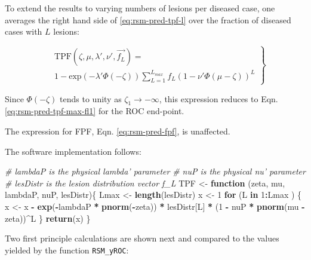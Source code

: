 \documentclass[
]{book}
\newenvironment{Shaded}{\begin{snugshade}}{\end{snugshade}}
\newcommand{\CommentTok}[1]{\textcolor[rgb]{0.56,0.35,0.01}{\textit{#1}}}
\newcommand{\ControlFlowTok}[1]{\textcolor[rgb]{0.13,0.29,0.53}{\textbf{#1}}}
\newcommand{\DecValTok}[1]{\textcolor[rgb]{0.00,0.00,0.81}{#1}}
\newcommand{\KeywordTok}[1]{\textcolor[rgb]{0.13,0.29,0.53}{\textbf{#1}}}
\newcommand{\NormalTok}[1]{#1}
\newcommand{\OperatorTok}[1]{\textcolor[rgb]{0.81,0.36,0.00}{\textbf{#1}}}
\newcommand{\StringTok}[1]{\textcolor[rgb]{0.31,0.60,0.02}{#1}}
\begin{document}
To extend the results to varying numbers of lesions per diseased case, one averages the right hand side of \eqref{eq:rsm-pred-tpf-l} over the fraction of diseased cases with \(L\) lesions:

\begin{equation}
\left.
\begin{aligned}
& \text{TPF}\left (\zeta , \mu, \lambda', \nu', \overrightarrow{f_L} \right ) =  \\
& 1 - \text{exp}\left ( -\lambda' \Phi \left ( -\zeta \right )\right ) 
\sum_{L=1}^{L_{max}} f_L  \left ( 1 - \nu' \Phi \left ( \mu -\zeta \right ) \right )^L 
\end{aligned}
\right \}
\label{eq:rsm-pred-tpf}
\end{equation}

Since \(\Phi \left ( -\zeta \right )\) tends to unity as \(\zeta_1 \rightarrow -\infty\), this expression reduces to Eqn. \eqref{eq:rsm-pred-tpf-max-fl1} for the ROC end-point.

The expression for FPF, Eqn. \eqref{eq:rsm-pred-fpf}, is unaffected.

The software implementation follows:

\begin{Shaded}
\begin{Highlighting}[]
\CommentTok{# lambdaP is the physical lambda' parameter}
\CommentTok{# nuP is the physical nu' parameter}
\CommentTok{# lesDistr is the lesion distribution vector f_L}
\NormalTok{TPF <-}\StringTok{ }\ControlFlowTok{function}\NormalTok{ (zeta, mu, lambdaP, nuP, lesDistr)\{}
\NormalTok{  Lmax <-}\StringTok{ }\KeywordTok{length}\NormalTok{(lesDistr)}
\NormalTok{  x <-}\StringTok{ }\DecValTok{1}
  \ControlFlowTok{for}\NormalTok{ (L }\ControlFlowTok{in} \DecValTok{1}\OperatorTok{:}\NormalTok{Lmax ) \{}
\NormalTok{    x <-}\StringTok{ }\NormalTok{x }\OperatorTok{-}\StringTok{ }\KeywordTok{exp}\NormalTok{(}\OperatorTok{-}\NormalTok{lambdaP }\OperatorTok{*}\StringTok{ }\KeywordTok{pnorm}\NormalTok{(}\OperatorTok{-}\NormalTok{zeta)) }\OperatorTok{*}\StringTok{ }\NormalTok{lesDistr[L] }\OperatorTok{*}\StringTok{ }\NormalTok{(}\DecValTok{1} \OperatorTok{-}\StringTok{ }\NormalTok{nuP }\OperatorTok{*}\StringTok{ }\KeywordTok{pnorm}\NormalTok{(mu }\OperatorTok{-}\StringTok{ }\NormalTok{zeta))}\OperatorTok{^}\NormalTok{L}
\NormalTok{  \}}
  \KeywordTok{return}\NormalTok{(x)}
\NormalTok{\}}
\end{Highlighting}
\end{Shaded}

Two first principle calculations are shown next and compared to the values yielded by the function \texttt{RSM\_yROC}:
\end{document}
